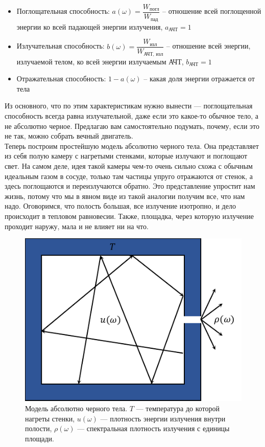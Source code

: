 \documentclass[12pt]{article}
\begin{document}
\begin{itemize}
    \item Поглощательная способность: $a(\omega) = \dfrac{W_{\text{погл}}}{W_{\text{пад}}}$ -- отношение всей поглощенной энергии ко всей падающей энергии излучения, $a_{\text{АЧТ}} = 1$
    \item Излучательная способность: $b(\omega) = \dfrac{W_{\text{изл}}}{W_{\text{АЧТ, изл}}}$ -- отношение всей энергии, излучаемой телом, ко всей энергии излучаемым АЧТ, $b_{\text{АЧТ}} = 1$
    \item Отражательная способность: $1 - a(\omega)$ -- какая доля энергии отражается от тела
\end{itemize}
Из основного, что по этим характеристикам нужно вынести --- поглощательная способность всегда равна излучательной, даже если это какое-то обычное тело, а не абсолютно черное. Предлагаю вам самостоятельно подумать, почему, если это не так, можно собрать вечный двигатель.
\\
Теперь построим простейшую модель абсолютно черного тела. Она представляет из себя полую камеру с нагретыми стенками, которые излучают и поглощают свет. На самом деле, идея такой камеры чем-то очень сильно схожа с обычным идеальным газом в сосуде, только там частицы упруго отражаются от стенок, а здесь поглощаются и переизлучаются обратно. Это представление упростит нам жизнь, потому что мы в явном виде из такой аналогии получим все, что нам надо. Оговоримся, что полость большая, все излучение изотропно, и дело происходит в тепловом равновесии. Также, площадка, через которую излучение проходит наружу, мала и не влияет ни на что. 
\\
\begin{figure}[h]
    \centering
    \includegraphics[scale=1.5]{Seminar_01/pics/pic_02.pdf}
    \caption{Модель абсолютно черного тела. $T$ --- температура до которой нагреты стенки, $u(\omega)$ --- плотность энергии излучения внутри полости, $\rho(\omega)$ --- спектральная плотность излучения с единицы площади.}
    \label{fig:sem_01_abb_model}
\end{figure}
\end{document}
